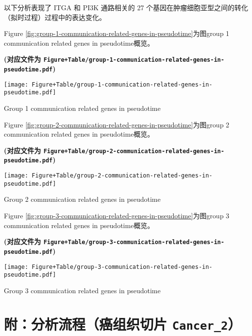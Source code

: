 \documentclass[
]{article}
\begin{document}
以下分析表现了 ITGA 和 PI3K 通路相关的 27 个基因在肿瘤细胞亚型之间的转化（拟时过程）过程中的表达变化。

Figure \ref{fig:group-1-communication-related-genes-in-pseudotime}为图group 1 communication related genes in pseudotime概览。

\textbf{(对应文件为 \texttt{Figure+Table/group-1-communication-related-genes-in-pseudotime.pdf})}

\def\@captype{figure}
\begin{center}
\texttt{[image: Figure+Table/group-1-communication-related-genes-in-pseudotime.pdf]}
\caption{Group 1 communication related genes in pseudotime}\label{fig:group-1-communication-related-genes-in-pseudotime}
\end{center}

Figure \ref{fig:group-2-communication-related-genes-in-pseudotime}为图group 2 communication related genes in pseudotime概览。

\textbf{(对应文件为 \texttt{Figure+Table/group-2-communication-related-genes-in-pseudotime.pdf})}

\def\@captype{figure}
\begin{center}
\texttt{[image: Figure+Table/group-2-communication-related-genes-in-pseudotime.pdf]}
\caption{Group 2 communication related genes in pseudotime}\label{fig:group-2-communication-related-genes-in-pseudotime}
\end{center}

Figure \ref{fig:group-3-communication-related-genes-in-pseudotime}为图group 3 communication related genes in pseudotime概览。

\textbf{(对应文件为 \texttt{Figure+Table/group-3-communication-related-genes-in-pseudotime.pdf})}

\def\@captype{figure}
\begin{center}
\texttt{[image: Figure+Table/group-3-communication-related-genes-in-pseudotime.pdf]}
\caption{Group 3 communication related genes in pseudotime}\label{fig:group-3-communication-related-genes-in-pseudotime}
\end{center}

\hypertarget{workflow2}{%
\section{\texorpdfstring{附：分析流程（癌组织切片 \texttt{Cancer\_2}）}{附：分析流程（癌组织切片 Cancer\_2）}}\label{workflow2}}
\end{document}
